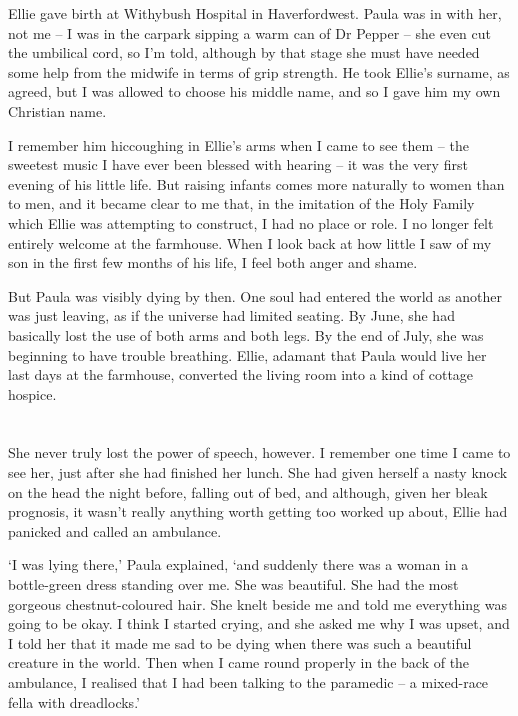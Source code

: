 Ellie gave birth at Withybush Hospital in Haverfordwest. Paula was in with her, not me -- I was in the carpark sipping a warm can of Dr Pepper -- she even cut the umbilical cord, so I'm told, although by that stage she must have needed some help from the midwife in terms of grip strength. He took Ellie's surname, as agreed, but I was allowed to choose his middle name, and so I gave him my own Christian name.

I remember him hiccoughing in Ellie's arms when I came to see them -- the sweetest music I have ever been blessed with hearing -- it was the very first evening of his little life. But raising infants comes more naturally to women than to men, and it became clear to me that, in the imitation of the Holy Family which Ellie was attempting to construct, I had no place or role. I no longer felt entirely welcome at the farmhouse. When I look back at how little I saw of my son in the first few months of his life, I feel both anger and shame.

But Paula was visibly dying by then. One soul had entered the world as another was just leaving, as if the universe had limited seating. By June, she had basically lost the use of both arms and both legs. By the end of July, she was beginning to have trouble breathing. Ellie, adamant that Paula would live her last days at the farmhouse, converted the living room into a kind of cottage hospice.

\section{}

She never truly lost the power of speech, however. I remember one time I came to see her, just after she had finished her lunch. She had given herself a nasty knock on the head the night before, falling out of bed, and although, given her bleak prognosis, it wasn't really anything worth getting too worked up about, Ellie had panicked and called an ambulance.

`I was lying there,' Paula explained, `and suddenly there was a woman in a bottle-green dress standing over me. She was beautiful. She had the most gorgeous chestnut-coloured hair. She knelt beside me and told me everything was going to be okay. I think I started crying, and she asked me why I was upset, and I told her that it made me sad to be dying when there was such a beautiful creature in the world. Then when I came round properly in the back of the ambulance, I realised that I had been talking to the paramedic -- a mixed-race fella with dreadlocks.'

